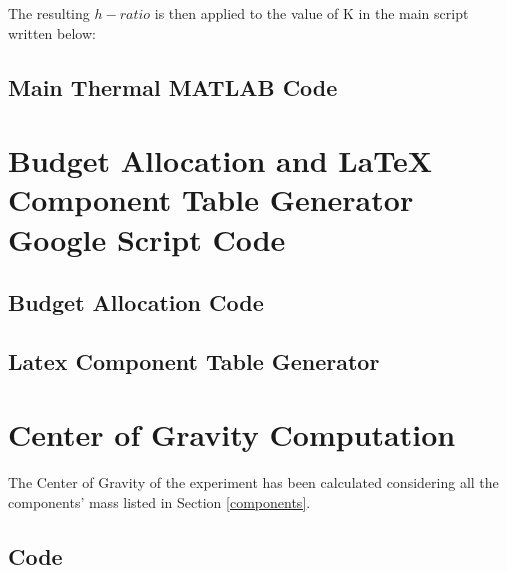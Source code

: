 \documentclass[a4paper,12pt,oneside]{article} %
\begin{document}
\begin{appendices}


The resulting $h-ratio$ is then applied to the value of K in the main script written below:

\subsection{Main Thermal MATLAB Code}




\newpage
\section{Budget Allocation and LaTeX Component Table Generator Google Script Code} \label{sec:appK}
\subsection{Budget Allocation Code}



\newpage
\subsection{Latex Component Table Generator}



\newpage


\newpage
\section{Center of Gravity Computation}



The Center of Gravity of the experiment has been calculated considering all the components' mass listed in Section \ref{components}.


\subsection{Code}


\end{appendices}
\end{document}
